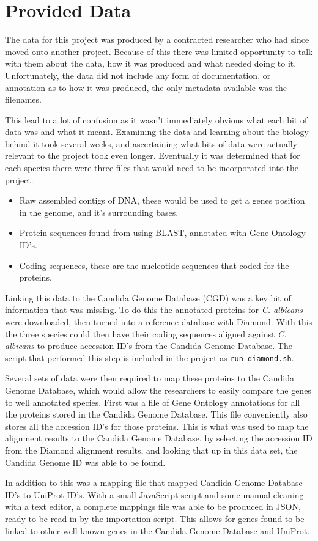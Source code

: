 \section{Provided Data}
The data for this project was produced by a contracted researcher who had since moved onto another project. Because of this there was limited opportunity to talk with them about the data, how it was produced and what needed doing to it. Unfortunately, the data did not include any form of documentation, or annotation as to how it was produced, the only metadata available was the filenames. 

This lead to a lot of confusion as it wasn't immediately obvious what each bit of data was and what it meant. Examining the data and learning about the biology behind it took several weeks, and ascertaining what bits of data were actually relevant to the project took even longer. Eventually it was determined that for each species there were three files that would need to be incorporated into the project.

\begin{itemize}
  \item Raw assembled contigs of DNA, these would be used to get a genes position in the genome, and it's surrounding bases. 
  \item Protein sequences found from using BLAST, annotated with Gene Ontology ID's.
  \item Coding sequences, these are the nucleotide sequences that coded for the proteins. 
\end{itemize}

Linking this data to the Candida Genome Database (CGD) was a key bit of information that was missing. To do this the annotated proteins\cite{albicans} for \textit{C. albicans} were downloaded, then turned into a reference database with Diamond. With this the three species could then have their coding sequences aligned against \textit{C. albicans} to produce accession ID's from the Candida Genome Database. The script that performed this step is included in the project as \texttt{run\_diamond.sh}.

Several sets of data were then required to map these proteins to the Candida Genome Database, which would allow the researchers to easily compare the genes to well annotated species. First was a file of Gene Ontology\cite{geneontology} annotations for all the proteins stored in the Candida Genome Database\cite{cgd-proteins}. This file conveniently also stores all the accession ID's for those proteins. This is what was used to map the alignment results to the Candida Genome Database, by selecting the accession ID from the Diamond alignment results, and looking that up in this data set, the Candida Genome ID was able to be found.

In addition to this was a mapping file that mapped Candida Genome Database ID's to UniProt\cite{uniprot} ID's. With a small JavaScript script and some manual cleaning with a text editor, a complete mappings file was able to be produced in JSON, ready to be read in by the importation script. This allows for genes found to be linked to other well known genes in the Candida Genome Database and UniProt.

